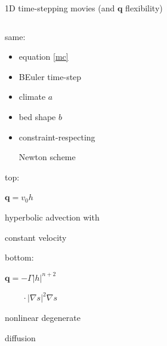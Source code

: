 \documentclass[xcolor={dvipsnames}]{beamer}
\newcommand\bq{\mathbf{q}}
\newcommand\grad{\nabla}
\begin{document}
\begin{frame}{1D time-stepping movies (and $\bq$ flexibility)}

\begin{columns}
\begin{column}{0.35\textwidth}
\alert{same:}

\begin{itemize}
\scriptsize
\item equation \eqref{mc}
\item BEuler time-step
\item climate $a$
\item bed shape $b$
\item constraint-respecting

Newton scheme
\end{itemize}

\vspace{2mm}

\alert{top:}

\scriptsize

\medskip
$\bq = v_0 h$

hyperbolic advection with

constant velocity

\vspace{5mm}

\normalsize 

\alert{bottom:}

\scriptsize

\medskip
$\bq = - \Gamma |h|^{n+2}$

$\phantom{\bq = }\, \cdot |\grad s|^2 \grad s$

nonlinear degenerate

diffusion
\end{column}
\begin{column}{0.5\textwidth}
\hspace{-15mm}

\bigskip
\hspace{-15mm}

\end{column}
\end{columns}
\end{frame}
\end{document}
